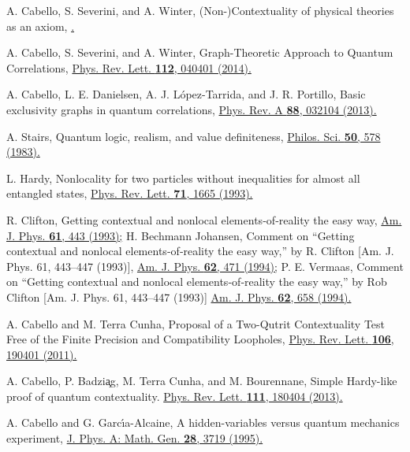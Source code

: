 \documentclass[%
 twocolumn,
 groupedaddress,
 showpacs,
 showkeys,
 preprintnumbers,
 amsmath,amssymb,
 aps,
 pra,
 longbibliography,
 floatfix,
 ]{revtex4-1}
\begin{document}
\begin{thebibliography}{99}
A. Cabello, S. Severini, and A. Winter,
(Non-)Contextuality of physical theories as an axiom,
\href{https://arxiv.org/abs/1010.2163}{.}

A. Cabello, S. Severini, and A. Winter,
Graph-Theoretic Approach to Quantum Correlations,
\href{http://dx.doi.org/10.1103/PhysRevLett.112.040401}{Phys. Rev. Lett. \textbf{112}, 040401 (2014).}

A. Cabello, L. E. Danielsen, A. J. L\'opez-Tarrida, and J. R. Portillo,
Basic exclusivity graphs in quantum correlations,
\href{http://dx.doi.org/10.1103/PhysRevA.88.032104}{Phys. Rev. A \textbf{88}, 032104 (2013).}

A. Stairs, 
Quantum logic, realism, and value definiteness,
\href{https://doi.org/10.1086/289140}{Philos. Sci. {\bf 50}, 578 (1983).}

L. Hardy,
Nonlocality for two particles without inequalities for almost all entangled states,
\href{https://doi.org/10.1103/PhysRevLett.71.1665}{Phys. Rev. Lett. \textbf{71}, 1665 (1993).}

R. Clifton,
Getting contextual and nonlocal elements‐of‐reality the easy way,
\href{https://doi.org/10.1119/1.17239}{Am. J. Phys. \textbf{61}, 443 (1993);}
H. Bechmann Johansen,
Comment on ``Getting contextual and nonlocal elements‐of‐reality the easy way,'' by R. Clifton [Am. J. Phys. 61, 443--447 (1993)],
\href{https://doi.org/10.1119/1.17551}{Am. J. Phys. \textbf{62}, 471 (1994);}
P. E. Vermaas,
Comment on ``Getting contextual and nonlocal elements‐of‐reality the easy way,'' by Rob Clifton [Am. J. Phys. 61, 443--447 (1993)]
\href{https://doi.org/10.1119/1.17488}{Am. J. Phys. \textbf{62}, 658 (1994).}

A. Cabello and M. Terra Cunha,
Proposal of a Two-Qutrit Contextuality Test Free of the Finite Precision and Compatibility Loopholes,
\href{http://dx.doi.org/10.1103/PhysRevLett.106.190401}{Phys. Rev. Lett. \textbf{106}, 190401 (2011).}

A. Cabello, P. Badzi{\c a}g, M. Terra Cunha, and M. Bourennane,
Simple Hardy-like proof of quantum contextuality.
\href{http://dx.doi.org/10.1103/PhysRevLett.111.180404 }{Phys. Rev. Lett. \textbf{111}, 180404 (2013).}

A. Cabello and G. Garc\'{\i}a-Alcaine,
A hidden-variables versus quantum mechanics experiment,
\href{https://doi.org/10.1088/0305-4470/28/13/016}{J. Phys. A: Math. Gen. \textbf{28}, 3719 (1995).}


\end{thebibliography}
\end{document}
